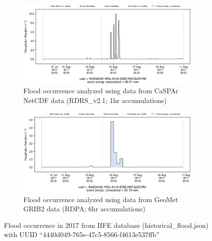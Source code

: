 \documentclass[10pt,a4paper,titlepage,parskip]{scrartcl}
\begin{document}
\begin{figure}[h]
	\begin{subfigure}[a]{1.0\textwidth}
		\centering
		\includegraphics[width=\linewidth]{figures/compare_Geomet_CaSPAr/interpolated_at_stations_occurrence_1059_identified-timesteps_RDRS_v2.1.png}
		\caption{Flood occurrence analyzed using data from CaSPAr NetCDF data (RDRS\_v2.1; 1hr accumulations)}
	\end{subfigure}
	\par\bigskip\bigskip
	\begin{subfigure}[b]{1.0\textwidth}
		\centering
		\includegraphics[width=\linewidth]{figures/compare_Geomet_CaSPAr/interpolated_at_stations_occurrence_1059_identified-timesteps_rdpa:10km:6f.png}
		\caption{Flood occurrence analyzed using data from GeoMet GRIB2 data (RDPA; 6hr accumulations)}
	\end{subfigure}
	\par\bigskip\bigskip
	\caption{Flood occurrence in 2017 from HFE database (historical\_flood.json) with UUID ``4440d049-765e-47c5-8566-f4613e537ffb''}
\end{figure}
\pagebreak
\end{document}
